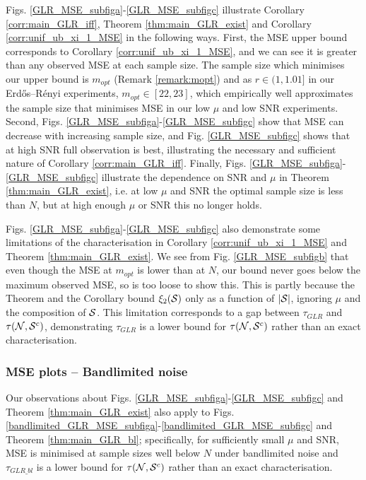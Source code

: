 Figs. \ref{GLR_MSE_subfiga}-\ref{GLR_MSE_subfigc} illustrate Corollary \ref{corr:main_GLR_iff}, Theorem \ref{thm:main_GLR_exist} and Corollary \ref{corr:unif_ub_xi_1_MSE} in the following ways. First, the MSE upper bound corresponds to Corollary \ref{corr:unif_ub_xi_1_MSE}, and we can see it is greater than any observed MSE at each sample size. The sample size which minimises our upper bound is $m_{opt}$ (Remark \ref{remark:mopt}) and as $r \in (1,1.01]$ in our Erdős–Rényi experiments, $m_{opt} \in [22,23]$, which empirically well approximates the sample size that minimises MSE in our low $\mu$ and low SNR experiments. %
Second, Figs. \ref{GLR_MSE_subfiga}-\ref{GLR_MSE_subfigc} show that MSE can decrease with increasing sample size, and Fig. \ref{GLR_MSE_subfigc} shows that at high SNR full observation is best, illustrating the necessary and sufficient nature of Corollary \ref{corr:main_GLR_iff}.
Finally, Figs. \ref{GLR_MSE_subfiga}-\ref{GLR_MSE_subfigc} illustrate the dependence on SNR and $\mu$ in Theorem \ref{thm:main_GLR_exist}, i.e. at low $\mu$ and SNR the optimal sample size is less than $N$, but at high enough $\mu$ or SNR this no longer holds.  

Figs. \ref{GLR_MSE_subfiga}-\ref{GLR_MSE_subfigc} also demonstrate some limitations of the characterisation in Corollary \ref{corr:unif_ub_xi_1_MSE} and Theorem \ref{thm:main_GLR_exist}. We see from Fig. \ref{GLR_MSE_subfigb} that even though the MSE at $m_{opt}$ is lower than at $N$, our bound never goes below the maximum observed MSE, so is too loose to show this. This is partly because the Theorem and the Corollary bound $\xi_{2}(\mathcal{S})$ only as a function of $|\mathcal{S}|$, ignoring $\mu$ and the composition of $\mathcal{S}$. This limitation corresponds to a gap between $\tau_{GLR}$ and $\tau(\mathcal{N},\mathcal{S}^{c})$, demonstrating $\tau_{GLR}$ is a lower bound for $\tau(\mathcal{N},\mathcal{S}^{c})$ rather than an exact characterisation.


\subsubsection{MSE plots -- Bandlimited noise}


Our observations about Figs. \ref{GLR_MSE_subfiga}-\ref{GLR_MSE_subfigc}  and Theorem \ref{thm:main_GLR_exist} also apply to Figs. \ref{bandlimited_GLR_MSE_subfiga}-\ref{bandlimited_GLR_MSE_subfigc} and Theorem \ref{thm:main_GLR_bl}; specifically, for sufficiently small $\mu$ and SNR, MSE is minimised at sample sizes well below $N$ under bandlimited noise and $\tau_{GLR\_bl}$ is a lower bound for $\tau(\mathcal{N},\mathcal{S}^{c})$ rather than an exact characterisation.

